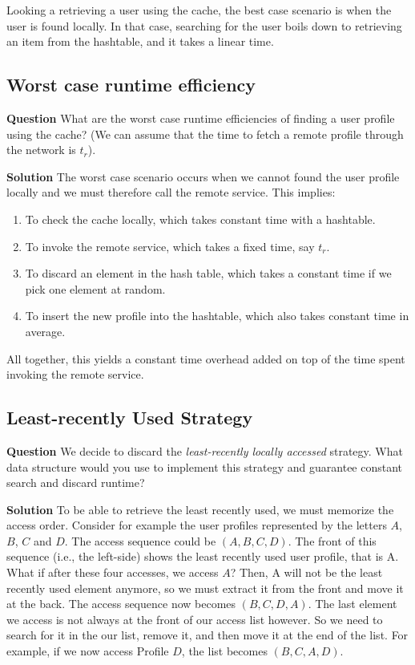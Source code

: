 \documentclass[11pt]{article}
\begin{document}
Looking a retrieving a user using the cache, the best case scenario
is when the user is found locally. In that case, searching for the
user boils down to retrieving an item from the hashtable, and it
takes a linear time.

\subsection{Worst case runtime efficiency}
\label{sec:orge4b88a9}
\textbf{Question} What are the worst case runtime efficiencies of finding
a user profile using the cache? (We can assume that the time to
fetch a remote profile through the network is \(t_r\)).

\textbf{Solution} The worst case scenario occurs when we cannot found the user profile
locally and we must therefore call the remote service. This implies:
\begin{enumerate}
\item To check the cache locally, which takes constant time with a
hashtable.
\item To invoke the remote service, which takes a fixed time, say
\(t_r\).
\item To discard an element in the hash table, which takes a
constant time if we pick one element at random.
\item To insert the new profile into the hashtable, which also
takes constant time in average.
\end{enumerate}
All together, this yields a constant time overhead added on
top of the time spent invoking the remote service.

\subsection{Least-recently Used Strategy}
\label{sec:orgf06bcc6}
\textbf{Question} We decide to discard the \emph{least-recently locally
  accessed} strategy. What data structure would you use to
  implement this strategy and guarantee constant search and discard
  runtime?

\textbf{Solution} To be able to retrieve the least recently used, we must
memorize the access order. Consider for example the user profiles
represented by the letters \(A\), \(B\), \(C\) and \(D\). The access
sequence could be \((A, B, C, D)\). The front of this sequence (i.e.,
the left-side) shows the least recently used user profile, that is
A. What if after these four accesses, we access \(A\)? Then, A will
not be the least recently used element anymore, so we must extract
it from the front and move it at the back. The access sequence now
becomes \((B, C, D, A)\). The last element we access is not always at
the front of our access list however. So we need to search
for it in the our list, remove it, and then move it at the end of the
list. For example, if we now access Profile \(D\), the list becomes
\((B, C, A, D)\).
\end{document}

